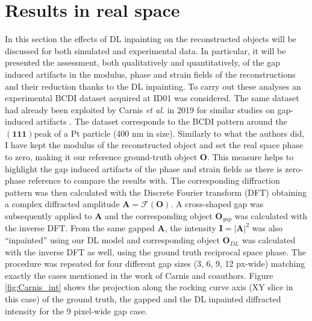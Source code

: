 \section{Results in real space}\label{sec:res_real}

In this section the effects of DL inpainting on the reconstructed objects will be discussed for both simulated and experimental 
data. In particular, it will be presented the assessment, both qualitatively and quantitatively, of the gap induced artifacts in 
the modulus, phase and strain fields of the reconstructions and their reduction thanks to the DL inpainting. To carry out
these analyses an experimental BCDI dataset acquired at ID01 was considered. The same dataset had already been exploited by 
Carnis \textit{et al.} in 2019 for similar studies on gap-induced artifacts \cite{carnis_towards_2019}. The dataset 
corresponds to the BCDI pattern around the $(\mathbf{111}) $peak of a Pt particle (400 nm in size). 
Similarly to what the authors did, I have kept the modulus of the reconstructed object and set the real space phase
to zero, making it our reference ground-truth object $\textbf{O}$. This measure helps to highlight the gap induced artifacts 
of the phase and strain fields as there is zero-phase 
reference to compare the results with. The corresponding diffraction pattern was then calculated with the Discrete
Fourier transform (DFT) obtaining a complex diffracted amplitude $\mathbf{A}=\mathcal{F}(\mathbf{O})$. A cross-shaped gap was 
subsequently applied to $\mathbf{A}$ and the corresponding object $\mathbf{O}_{gap}$ was calculated with the inverse DFT.
From the same gapped $\mathbf{A}$, the intensity $\mathbf{I} = |\mathbf{A}|^2$ was also ``inpainted'' using our DL model 
and corresponding object $\mathbf{O}_{DL}$ was calculated with the inverse DFT as well, using the ground truth reciprocal 
space phase. The procedure was repeated for four different gap sizes (3, 6, 9, 12 px-wide) matching exactly the cases 
mentioned in the work of Carnis and coauthors. Figure \ref{fig:Carnis_int} shows the projection along the rocking curve 
axis (XY slice in this case) of the ground truth, the gapped and the DL inpainted diffracted intensity for the 
9 pixel-wide gap case.

